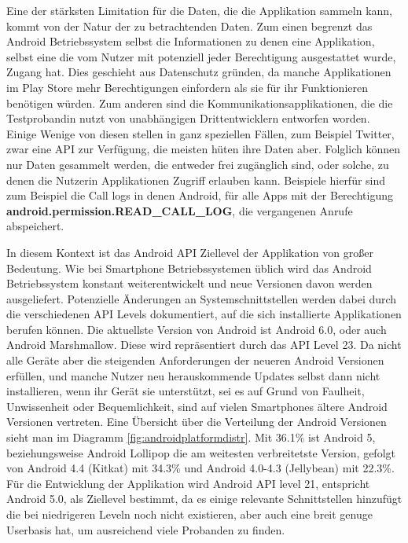 Eine der stärksten Limitation für die Daten, die die Applikation sammeln kann, kommt von der Natur der zu betrachtenden Daten.
Zum einen begrenzt das Android Betriebssystem selbst die Informationen zu denen eine Applikation, selbst eine die vom Nutzer mit potenziell jeder Berechtigung ausgestattet wurde, Zugang hat.
Dies geschieht aus Datenschutz gründen, da manche Applikationen im Play Store mehr Berechtigungen einfordern als sie für ihr Funktionieren benötigen würden.
Zum anderen sind die Kommunikationsapplikationen, die die Testprobandin nutzt von unabhängigen Drittentwicklern entworfen worden.
Einige Wenige von diesen stellen in ganz speziellen Fällen, zum Beispiel Twitter\cite{twitterapi}, zwar eine API zur Verfügung, die meisten hüten ihre Daten aber.
Folglich können nur Daten gesammelt werden, die entweder frei zugänglich sind, oder solche, zu denen die Nutzerin Applikationen Zugriff erlauben kann.
Beispiele hierfür sind zum Beispiel die Call logs in denen Android, für alle Apps mit der Berechtigung \textbf{android.permission.READ\_CALL\_LOG}, die vergangenen Anrufe abspeichert.
\par

In diesem Kontext ist das Android API Ziellevel der Applikation von großer Bedeutung.
Wie bei Smartphone Betriebssystemen üblich wird das Android Betriebssystem konstant weiterentwickelt und neue Versionen davon werden ausgeliefert.
Potenzielle Änderungen an Systemschnittstellen werden dabei durch die verschiedenen API Levels dokumentiert, auf die sich installierte Applikationen berufen können.
Die aktuellste Version von Android ist Android 6.0, oder auch Android Marshmallow.
Diese wird repräsentiert durch das API Level 23.
Da nicht alle Geräte aber die steigenden Anforderungen der neueren Android Versionen erfüllen, 
und manche Nutzer neu herauskommende Updates selbst dann nicht installieren, wenn ihr Gerät sie unterstützt, 
sei es auf Grund von Faulheit, Unwissenheit oder Bequemlichkeit, sind auf vielen Smartphones ältere Android Versionen vertreten.
Eine Übersicht über die Verteilung der Android Versionen sieht man im Diagramm \ref{fig:androidplatformdistr}.
Mit 36.1\% ist Android 5, beziehungsweise Android Lollipop die am weitesten verbreitetste Version,
gefolgt von Android 4.4 (Kitkat) mit 34.3\% und Android 4.0-4.3 (Jellybean) mit 22.3\%\cite{androiddistr}.
Für die Entwicklung der Applikation wird Android API level 21, entspricht Android 5.0, als Ziellevel bestimmt, da es einige relevante Schnittstellen hinzufügt die bei niedrigeren Leveln noch nicht existieren, aber auch eine breit genuge Userbasis hat, um ausreichend viele Probanden zu finden.


